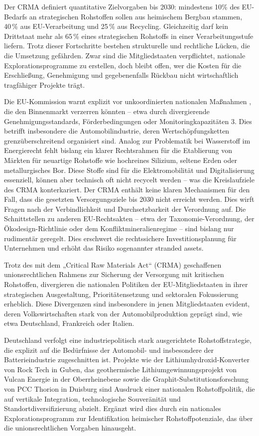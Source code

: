 \documentclass[12pt,a4paper,oneside]{book} %
\begin{document}
	Der CRMA definiert quantitative Zielvorgaben bis 2030: mindestens 10\% des EU-Bedarfs an strategischen Rohstoffen sollen aus heimischem Bergbau stammen, 40 \% aus EU-Verarbeitung und 25 \% aus Recycling. Gleichzeitig darf kein Drittstaat mehr als 65 \% eines strategischen Rohstoffs in einer Verarbeitungsstufe liefern. Trotz dieser Fortschritte bestehen strukturelle und rechtliche Lücken, die die Umsetzung gefährden. Zwar sind die Mitgliedstaaten verpflichtet, nationale Explorationsprogramme zu erstellen, doch bleibt offen, wer die Kosten für die Erschließung, Genehmigung und gegebenenfalls Rückbau nicht wirtschaftlich tragfähiger Projekte trägt.
	
	Die EU-Kommission warnt explizit vor \glqq unkoordinierten nationalen Maßnahmen \grqq, die den Binnenmarkt verzerren könnten – etwa durch divergierende Genehmigungsstandards, Förderbedingungen oder Monitoringkapazitäten 3. Dies betrifft insbesondere die Automobilindustrie, deren Wertschöpfungsketten grenzüberschreitend organisiert sind. Analog zur Problematik bei Wasserstoff im Energierecht fehlt bislang ein klarer Rechtsrahmen für die Etablierung von Märkten für neuartige Rohstoffe wie hochreines Silizium, seltene Erden oder metallurgisches Bor. Diese Stoffe sind für die Elektromobilität und Digitalisierung essenziell, können aber technisch oft nicht recycelt werden – was die Kreislaufziele des CRMA konterkariert. Der CRMA enthält keine klaren Mechanismen für den Fall, dass die gesetzten Versorgungsziele bis 2030 nicht erreicht werden. Dies wirft Fragen nach der Verbindlichkeit und Durchsetzbarkeit der Verordnung auf. Die Schnittstellen zu anderen EU-Rechtsakten – etwa der Taxonomie-Verordnung, der Ökodesign-Richtlinie oder dem Konfliktmineralienregime – sind bislang nur rudimentär geregelt. Dies erschwert die rechtssichere Investitionsplanung für Unternehmen und erhöht das Risiko sogenannter \glqq stranded assets\grqq.
	
Trotz des mit dem „Critical Raw Materials Act“ (CRMA) geschaffenen unionsrechtlichen Rahmens zur Sicherung der Versorgung mit kritischen Rohstoffen, divergieren die nationalen Politiken der EU-Mitgliedstaaten in ihrer strategischen Ausgestaltung, Prioritätensetzung und sektoralen Fokussierung erheblich. Diese Divergenzen sind insbesondere in jenen Mitgliedstaaten evident, deren Volkswirtschaften stark von der Automobilproduktion geprägt sind, wie etwa Deutschland, Frankreich oder Italien.

Deutschland verfolgt eine industriepolitisch stark ausgerichtete Rohstoffstrategie, die explizit auf die Bedürfnisse der Automobil- und insbesondere der Batterieindustrie zugeschnitten ist. Projekte wie der Lithiumhydroxid-Konverter von Rock Tech in Guben, das geothermische Lithiumgewinnungsprojekt von Vulcan Energie in der Oberrheinebene sowie die Graphit-Substitutionsforschung von PCC Thorion in Duisburg sind Ausdruck einer nationalen Rohstoffpolitik, die auf vertikale Integration, technologische Souveränität und Standortdiversifizierung abzielt. Ergänzt wird dies durch ein nationales Explorationsprogramm zur Identifikation heimischer Rohstoffpotenziale, das über die unionsrechtlichen Vorgaben hinausgeht.
\end{document}
